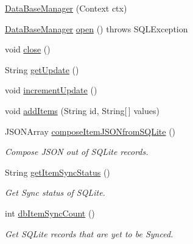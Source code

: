 \begin{DoxyCompactItemize}
\item 
\hyperlink{classcom_1_1example_1_1santh_1_1shoppinglist_1_1_data_base_manager_a794167dc3d55c445b8e0f96a50a2f570}{Data\+Base\+Manager} (Context ctx)
\item 
\hyperlink{classcom_1_1example_1_1santh_1_1shoppinglist_1_1_data_base_manager}{Data\+Base\+Manager} \hyperlink{classcom_1_1example_1_1santh_1_1shoppinglist_1_1_data_base_manager_a15cb7f87bbd79a28317ec8079cad963c}{open} ()  throws S\+Q\+L\+Exception 
\item 
void \hyperlink{classcom_1_1example_1_1santh_1_1shoppinglist_1_1_data_base_manager_af981f3e0544fdd6ea19850a0726fbc16}{close} ()
\item 
String \hyperlink{classcom_1_1example_1_1santh_1_1shoppinglist_1_1_data_base_manager_a57ca116807f9a1712924ff51b5c524b7}{get\+Update} ()
\item 
void \hyperlink{classcom_1_1example_1_1santh_1_1shoppinglist_1_1_data_base_manager_a162a3013d5e24320bbcecda77245ab64}{increment\+Update} ()
\item 
void \hyperlink{classcom_1_1example_1_1santh_1_1shoppinglist_1_1_data_base_manager_afe09b80b8a6f0caa804c329738b39163}{add\+Items} (String id, String\mbox{[}$\,$\mbox{]} values)
\item 
J\+S\+O\+N\+Array \hyperlink{classcom_1_1example_1_1santh_1_1shoppinglist_1_1_data_base_manager_a906eed7209379bd1829f268a99c38f21}{compose\+Item\+J\+S\+O\+Nfrom\+S\+Q\+Lite} ()
\begin{DoxyCompactList}\small\item\em Compose J\+S\+ON out of S\+Q\+Lite records. \end{DoxyCompactList}\item 
String \hyperlink{classcom_1_1example_1_1santh_1_1shoppinglist_1_1_data_base_manager_a2906a3cfcc6af2afa4d0448ef15b3b1c}{get\+Item\+Sync\+Status} ()
\begin{DoxyCompactList}\small\item\em Get Sync status of S\+Q\+Lite. \end{DoxyCompactList}\item 
int \hyperlink{classcom_1_1example_1_1santh_1_1shoppinglist_1_1_data_base_manager_ace7f807903efc4baedf52d82144a6999}{db\+Item\+Sync\+Count} ()
\begin{DoxyCompactList}\small\item\em Get S\+Q\+Lite records that are yet to be Synced. \end{DoxyCompactList}\item 

\end{DoxyCompactItemize}
